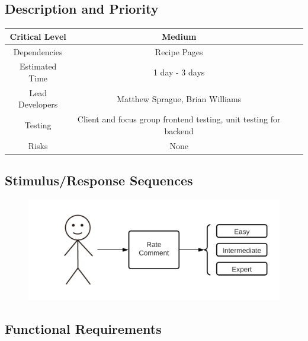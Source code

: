 \documentclass{scrreprt}
\begin{document}
\subsection{Description and Priority}
\begin{center}
    \begin{tabular}{| c | c | c | c |}
        \hline
        Critical Level  & Medium                                                            \\
        \hline
        Dependencies    & Recipe Pages                                                      \\
        \hline
        Estimated Time  & 1 day - 3 days                                                    \\
        \hline
        Lead Developers & Matthew Sprague, Brian Williams                                   \\
        \hline
        Testing         & Client and focus group frontend testing, unit testing for backend \\
        \hline
        Risks           & None                                                              \\
        \hline
    \end{tabular}
\end{center}

\subsection{Stimulus/Response Sequences}

\begin{figure}[H]\centering
    \includegraphics[width=\columnwidth]{FlowCharts/Recipe-Difficulty.png}
\end{figure}

\subsection{Functional Requirements}
\end{document}
